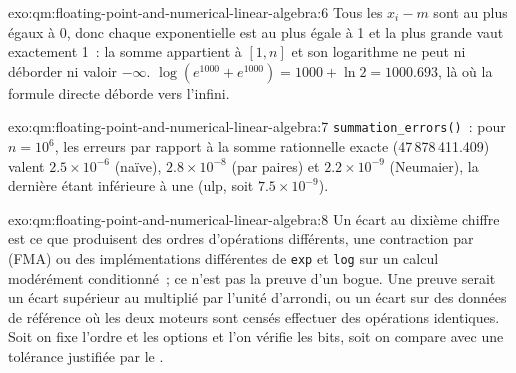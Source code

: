 \begin{solution}{exo:qm:floating-point-and-numerical-linear-algebra:6}
Tous les $x_i - m$ sont au plus égaux à 0, donc chaque exponentielle est au plus égale à 1 et la plus grande vaut exactement 1~: la somme appartient à $[1, n]$ et son logarithme ne peut ni déborder ni valoir $-\infty$. $\log(e^{1000} + e^{1000}) =
1000 + \ln2 = 1000.693$, là où la formule directe déborde vers l'infini.
\end{solution}

\begin{solution}{exo:qm:floating-point-and-numerical-linear-algebra:7}
\texttt{summation\_errors()}~: pour $n = 10^6$, les erreurs par rapport à la somme rationnelle exacte (47\,878\,411.409) valent $2.5 \times 10^{-6}$ (naïve), $2.8 \times 10^{-8}$ (par paires) et $2.2 \times 10^{-9}$
(Neumaier), la dernière étant inférieure à une  (ulp, soit $7.5 \times 10^{-9}$).
\end{solution}

\begin{solution}{exo:qm:floating-point-and-numerical-linear-algebra:8}
Un écart au dixième chiffre est ce que produisent des ordres d'opérations différents, une contraction par  (FMA) ou des implémentations différentes de \texttt{exp} et \texttt{log} sur un calcul modérément
conditionné~; ce n'est pas la preuve d'un bogue. Une preuve serait un écart supérieur au  multiplié par l'unité d'arrondi, ou un écart sur des données de référence où les deux moteurs sont censés
effectuer des opérations identiques. Soit on fixe l'ordre et les options et l'on vérifie les bits, soit on compare avec une tolérance justifiée par le .
\end{solution}

